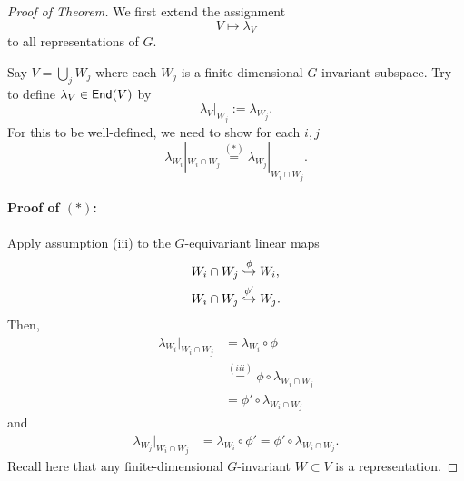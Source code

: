 \begin{proof}[Proof of Theorem]
We first extend the assignment
\[ V \mapsto \lambda_V \]
to all representations of $G$.

Say $V = \bigcup_{j} W_j$ where each $W_j$ is a finite-dimensional $G$-invariant subspace. Try to define $\lambda_V \in  \textsf{End}(V)$ by 
\[ \lambda_V|_{W_j} := \lambda_{W_j}. \]
For this to be well-defined, we need to show for each $i,j$
\[ \lambda_{W_i}|_{W_i \cap W_j} \overset{(*)}{=} \lambda_{W_j}|_{W_i \cap W_j}. \]

\paragraph{Proof of $(*)$:} Apply assumption (iii) to the $G$-equivariant linear maps
\begin{align*}
W_i \cap W_j &\overset{\phi}{\hookrightarrow} W_i,\\
W_i \cap W_j &\overset{\phi'}{\hookrightarrow} W_j.\\
\end{align*}
Then,
\begin{align*}
\lambda_{W_i} |_{W_i \cap W_j} & = \lambda_{W_i} \circ \phi \\
&\overset{(iii)}{=} \phi\circ \lambda_{W_i \cap W_j} \\
&= \phi'\circ \lambda_{W_i \cap W_j}
\end{align*}
and
\begin{align*}
\lambda_{W_j} |_{W_i \cap W_j} & = \lambda_{W_i} \circ \phi' =  \phi'\circ \lambda_{W_i \cap W_j}.
\end{align*}
Recall here that any finite-dimensional $G$-invariant $W\subset V$ is a representation.
\end{proof}
